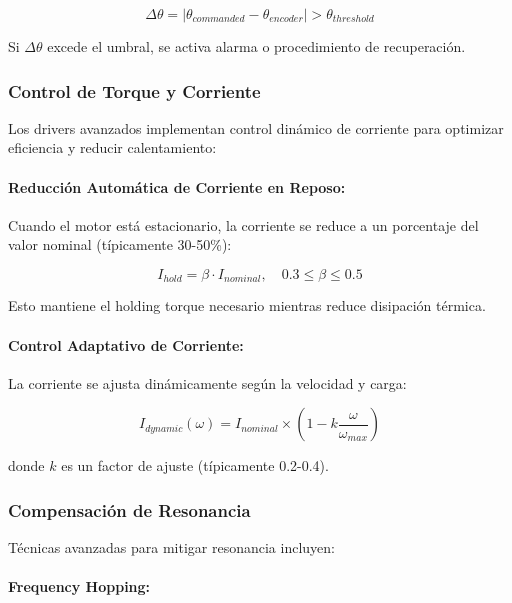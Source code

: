\begin{equation}
\Delta\theta = |\theta_{commanded} - \theta_{encoder}| > \theta_{threshold}
\end{equation}

Si $\Delta\theta$ excede el umbral, se activa alarma o procedimiento de recuperación.

\subsubsection{Control de Torque y Corriente}

Los drivers avanzados implementan control dinámico de corriente para optimizar eficiencia y reducir calentamiento:

\paragraph{Reducción Automática de Corriente en Reposo:}

Cuando el motor está estacionario, la corriente se reduce a un porcentaje del valor nominal (típicamente 30-50\%):

\begin{equation}
I_{hold} = \beta \cdot I_{nominal}, \quad 0.3 \leq \beta \leq 0.5
\end{equation}

Esto mantiene el holding torque necesario mientras reduce disipación térmica.

\paragraph{Control Adaptativo de Corriente:}

La corriente se ajusta dinámicamente según la velocidad y carga:

\begin{equation}
I_{dynamic}(\omega) = I_{nominal} \times \left(1 - k \frac{\omega}{\omega_{max}}\right)
\end{equation}

donde $k$ es un factor de ajuste (típicamente 0.2-0.4).

\subsubsection{Compensación de Resonancia}

Técnicas avanzadas para mitigar resonancia incluyen:

\paragraph{Frequency Hopping:}

